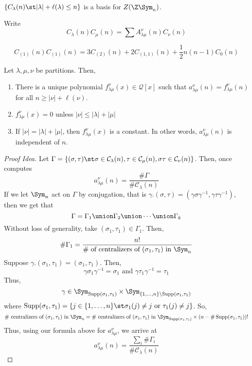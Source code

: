 \documentclass[11pt,leqno,oneside]{amsbook}
\renewcommand{\Q}{\mathcal{Q}}
\newcommand{\CC}{\mathcal{C}} %
\DeclareMathOperator{\Supp}{Supp}
\numberwithin{thm}{section}
\begin{document}
\begin{prop}
  \(\{C_\lambda(n) \st |\lambda|+\ell(\lambda) \leq n\}\) is a basis
  for \(Z(\Z \Sym_n)\). 
\end{prop}
\begin{defn}
  Write \[
    C_\lambda(n) C_\mu(n) = \sum A_{\lambda \mu}^\nu(n) C_\nu(n)
  \]
\end{defn}
\begin{example}
  \[
    C_{(1)}(n) C_{(1)}(n) = 3 C_{(2)}(n) + 2 C_{(1,1)}(n) +
    \frac{1}{2}n(n-1) C_0(n)
  \]
\end{example}
\begin{thm}
  Let \(\lambda,\mu,\nu\) be partitions. Then,
  \begin{enumerate}
  \item There is a unique polynomial \(f_{\lambda \mu}^\nu(x) \in
    \Q[x]\) such that \(a_{\lambda \mu}^\nu(n) = f_{\lambda
      \mu}^\nu(n)\) for all \(n \geq |\nu|+\ell(\nu)\).
  \item \(f_{\lambda \mu}^\nu(x) = 0\) unless \(|\nu| \leq
    |\lambda|+|\mu|\)
  \item If \(|\nu| = |\lambda|+|\mu|\), then \(f_{\lambda
      \mu}^\nu(x)\) is a constant. In other words, \(a_{\lambda
      \mu}^\nu(n)\) is independent of \(n\).
  \end{enumerate}
\end{thm}
\begin{proof}[Proof Idea]
  Let \(\Gamma = \{(\sigma,\tau) \st \sigma \in \CC_\lambda(n), \tau
  \in \CC_\mu(n), \sigma \tau \in \CC_\nu(n)\}\). Then, once
  computes \[
    a_{\lambda \mu}^\nu(n) = \frac{\# \Gamma}{\# \CC_\lambda(n)}
  \]
  If we let \(\Sym_n\) act on \(\Gamma\) by conjugation, that is
  \(\gamma.(\sigma,\tau) = (\gamma \sigma \gamma^{-1}, \gamma \tau
  \gamma^{-1})\), then we get that \[
    \Gamma = \Gamma_1 \union \Gamma_2 \union \cdots \union \Gamma_k
  \]
  Without loss of generality, take \((\sigma_1, \tau_1) \in
  \Gamma_1\). Then, \[
    \# \Gamma_1 = \frac{n!}{\#\text{ of centralizers of
      }(\sigma_1,\tau_1)\text{ in }\Sym_n}
  \]
  Suppose \(\gamma.(\sigma_1,\tau_1) = (\sigma_1,\tau_1)\). Then, \[
    \gamma \sigma_1 \gamma^{-1} = \sigma_1 \text{ and } \gamma \tau_1
    \gamma^{-1} = \tau_1
  \]
  Thus, \[
    \gamma \in \Sym_{\Supp(\sigma_1,\tau_1)} \times
    \Sym_{\{1,\ldots,n\} \setminus \Supp(\sigma_1, \tau_1)}
  \]
  where \(\Supp(\sigma_1,\tau_1) = \{j \in \{1,\ldots,n\} \st
  \sigma_1(j) \neq j \text{ or }\tau_1(j) \neq j\}\). So, \[
    \# \text{ centralizers of }(\sigma_1, \tau_1)\text{ in }\Sym_n =
    \# \text{ centralizers of }(\sigma_1, \tau_1)\text{ in
    }\Sym_{\Supp(\sigma_1,\tau_1)} \times (n - \# \Supp(\sigma_1,\tau_1))!
  \]
  Thus, using our formula above for \(a_{\lambda \mu}^\nu\), we arrive
  at \[
    a_{\lambda \mu}^\nu(n) = \frac{\sum_i \# \Gamma_i}{\#
      \CC_\lambda(n)}
  \]
\end{proof}
\end{document}
